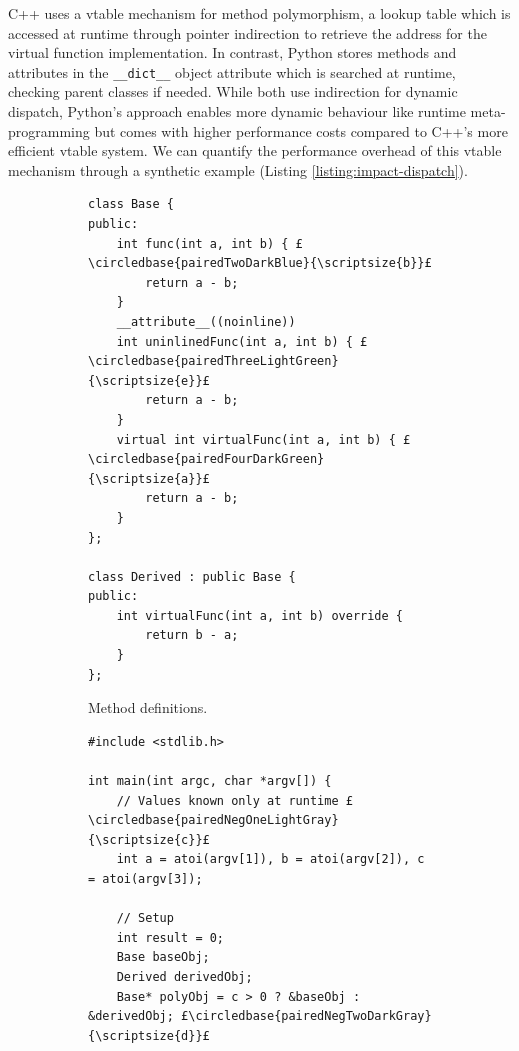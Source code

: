 C++ uses a \ac{vtable} mechanism for method polymorphism, a lookup table which is accessed at runtime through pointer indirection to retrieve the address for the virtual function implementation. In contrast, Python stores methods and attributes in the \texttt{__dict__} object attribute which is searched at runtime, checking parent classes if needed. While both use indirection for dynamic dispatch, Python's approach enables more dynamic behaviour like runtime meta-programming but comes with higher performance costs compared to C++'s more efficient \ac{vtable} system.
We can quantify the performance overhead of this \ac{vtable} mechanism through a synthetic example (Listing \ref{listing:impact-dispatch}).


\begin{figure}[H]
    \centering
    \begin{subfigure}[b]{0.45\textwidth}
       \centering
        \begin{verbatim}
class Base {
public:
    int func(int a, int b) { £\circledbase{pairedTwoDarkBlue}{\scriptsize{b}}£
        return a - b;
    }
    __attribute__((noinline))
    int uninlinedFunc(int a, int b) { £\circledbase{pairedThreeLightGreen}{\scriptsize{e}}£
        return a - b;
    }
    virtual int virtualFunc(int a, int b) { £\circledbase{pairedFourDarkGreen}{\scriptsize{a}}£
        return a - b;
    }
};

class Derived : public Base {
public:
    int virtualFunc(int a, int b) override {
        return b - a;
    }
};
        \end{verbatim}
        \scriptsize{\vspace{1em}}
        \captionsetup{name=Listing}
        \caption{Method definitions.}
        \label{listing:impact-dispatch-definition}
    \end{subfigure}
    \hfill
    \begin{subfigure}[b]{0.45\textwidth}
        \centering
        \begin{verbatim}
#include <stdlib.h>

int main(int argc, char *argv[]) {
    // Values known only at runtime £\circledbase{pairedNegOneLightGray}{\scriptsize{c}}£
    int a = atoi(argv[1]), b = atoi(argv[2]), c = atoi(argv[3]);

    // Setup
    int result = 0;
    Base baseObj;
    Derived derivedObj;
    Base* polyObj = c > 0 ? &baseObj : &derivedObj; £\circledbase{pairedNegTwoDarkGray}{\scriptsize{d}}£


\end{verbatim}
\end{subfigure}
\end{figure}
